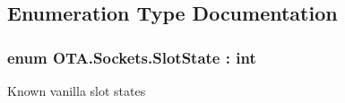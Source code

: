 \subsection{Enumeration Type Documentation}
\hypertarget{namespace_o_t_a_1_1_sockets_a716a4cdcbec05bdeb647942d47724ce8}{}
\subsubsection[{Slot\+State}]{\setlength{\rightskip}{0pt plus 5cm}enum {\bf O\+T\+A.\+Sockets.\+Slot\+State} \+: int\hspace{0.3cm}{\ttfamily [strong]}}\label{namespace_o_t_a_1_1_sockets_a716a4cdcbec05bdeb647942d47724ce8}


Known vanilla slot states 


